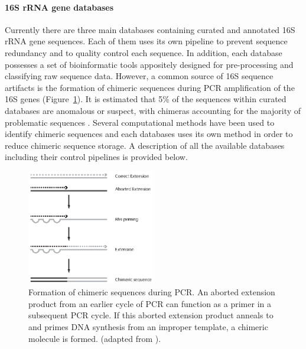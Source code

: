 \paragraph{16S rRNA gene databases}
Currently there are three main databases containing curated and annotated 16S rRNA gene sequences. Each of them uses its own pipeline to prevent sequence redundancy and to quality control each sequence. In addition, each database possesses a set of bioinformatic tools appositely designed for pre-processing and classifying raw sequence data. However, a common source of 16S sequence artifacts is the formation of chimeric sequences during PCR amplification of the 16S genes (Figure~\ref{fig:chimeric}). It is estimated that 5\% of the sequences within curated databases are anomalous or suspect, with chimeras accounting for the majority of problematic sequences \cite{ashelford2005least}. Several computational methods have been used to identify chimeric sequences and each databases uses its own method in order to reduce chimeric sequence storage. A description of all the available databases including their control pipelines is provided below.\\%
\begin{figure}[!tb]
	\centering
	\includegraphics[width=0.5\textwidth]{./figures/Introduction/chimeric_sequence}
  	\caption{Formation of chimeric sequences during PCR. An aborted extension product from an earlier cycle of PCR can function as a primer in a subsequent PCR cycle. If this aborted extension product anneals to and primes DNA synthesis from an improper template, a chimeric molecule is formed. (adapted from \cite{haas2011chimeric}).\label{fig:chimeric}}
\end{figure}%
